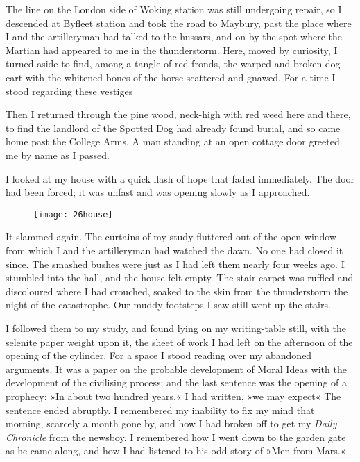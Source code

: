 The line on the London side of Woking station was still undergoing repair, so I descended at Byfleet station and took the road to Maybury, past the place where I and the artilleryman had talked to the hussars, and on by the spot where the Martian had appeared to me in the thunderstorm. Here, moved by curiosity, I turned aside to find, among a tangle of red fronds, the warped and broken dog cart with the whitened bones of the horse scattered and gnawed. For a time I stood regarding these vestiges\textellipsis

Then I returned through the pine wood, neck-high with red weed here and there, to find the landlord of the Spotted Dog had already found burial, and so came home past the College Arms. A man standing at an open cottage door greeted me by name as I passed.

I looked at my house with a quick flash of hope that faded immediately. The door had been forced; it was unfast and was opening slowly as I approached.


\begin{figure}[tb]
\centering
\texttt{[image: 26house]}
\end{figure}

It slammed again. The curtains of my study fluttered out of the open window from which I and the artilleryman had watched the dawn. No one had closed it since. The smashed bushes were just as I had left them nearly four weeks ago. I stumbled into the hall, and the house felt empty. The stair carpet was ruffled and discoloured where I had crouched, soaked to the skin from the thunderstorm the night of the catastrophe. Our muddy footsteps I saw still went up the stairs.

I followed them to my study, and found lying on my writing-table still, with the selenite paper weight upon it, the sheet of work I had left on the afternoon of the opening of the cylinder. For a space I stood reading over my abandoned arguments. It was a paper on the probable development of Moral Ideas with the development of the civilising process; and the last sentence was the opening of a prophecy: »In about two hundred years,« I had written, »we may expect\longdash« The sentence ended abruptly. I remembered my inability to fix my mind that morning, scarcely a month gone by, and how I had broken off to get my \textit{Daily Chronicle} from the newsboy. I remembered how I went down to the garden gate as he came along, and how I had listened to his odd story of »Men from Mars.«

